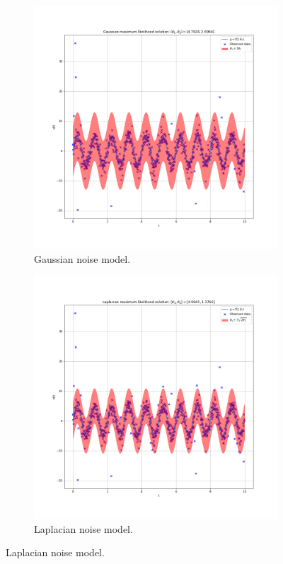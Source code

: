 \documentclass{article}
\begin{document}
\begin{figure}[!htb]
     \centering
     \begin{subfigure}[b]{0.49\textwidth}
         \centering
         \includegraphics[width=\textwidth]{Q3c_fig2.png}
         \caption{Gaussian noise model.}
     \end{subfigure}
     \hfill
     \begin{subfigure}[b]{0.49\textwidth}
         \centering
         \includegraphics[width=\textwidth]{Q3c_fig3.png}
         \caption{Laplacian noise model.}
     \end{subfigure}
     

\end{figure}
\end{document}
